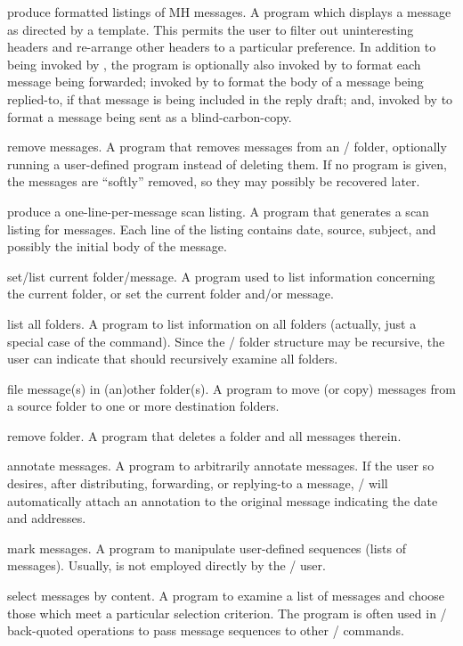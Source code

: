  produce formatted listings of MH messages.
A program which displays a message as directed by a template.
This permits the user to filter out uninteresting headers
and re-arrange other headers to a particular preference.
In addition to being invoked by ,
the  program is optionally also
invoked by  to format each message being forwarded;
invoked by  to format the body of a message being replied-to,
if that message is being included in the reply draft;
and,
invoked by  to format a message being sent as a blind-carbon-copy.

 remove messages.
A program that removes messages from an \MH/ folder,
optionally running a user-defined program instead of deleting them.
If no program is given,
the messages are ``softly'' removed,
so they may possibly be recovered later.

 produce a one-line-per-message scan listing.
A program that generates a scan listing for messages.
Each line of the listing contains date, source, subject,
and possibly the initial body of the message.

 set/list current folder/message.
A program used to list information concerning the current folder,
or set the current folder and/or message.

 list all folders.
A program to list information on all folders
(actually, just a special case of the  command).
Since the \MH/ folder structure may be recursive,
the user can indicate that  should recursively examine all
folders.

 file message(s) in (an)other folder(s).
A program to move (or copy) messages from a source folder to one or more
destination folders.

 remove folder.
A program that deletes a folder and all messages therein.

 annotate messages.
A program to arbitrarily annotate messages.
If the user so desires,
after distributing, forwarding, or replying-to a message,
\MH/ will automatically attach an annotation to the
original message indicating the date and addresses.

 mark messages.
A program to manipulate user-defined sequences (lists of messages).
Usually,  is not employed directly by the \MH/ user.

 select messages by content.
A program to examine a list of messages and choose those which meet a
particular selection criterion.
The  program is often used in \unix/ back-quoted operations to pass
message sequences to other \MH/ commands.

